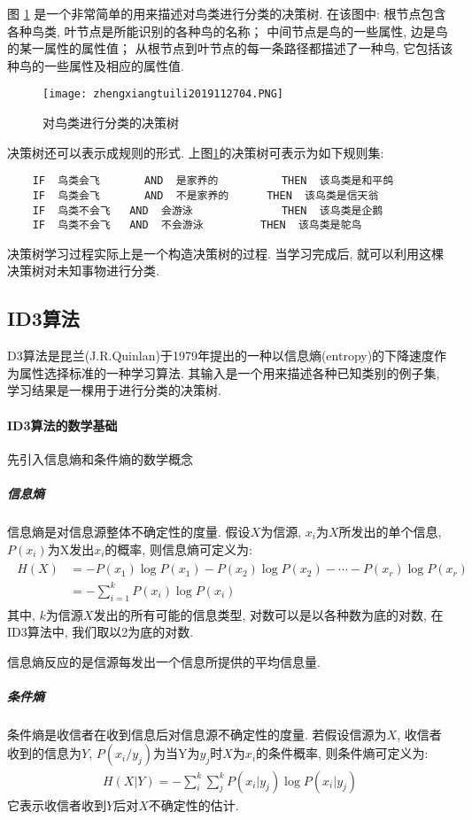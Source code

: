 图 \ref{AI32fig2704} 是一个非常简单的用来描述对鸟类进行分类的决策树.
在该图中: 根节点包含各种鸟类, 叶节点是所能识别的各种鸟的名称； 中间节点是鸟的一些属性, 边是鸟的某一属性的属性值； 从根节点到叶节点的每一条路径都描述了一种鸟, 它包括该种鸟的一些属性及相应的属性值.
\begin{figure}[H]
\centering
\texttt{[image: zhengxiangtuili2019112704.PNG]}
\caption{对鸟类进行分类的决策树}
\label{AI32fig2704}
\end{figure}
 决策树还可以表示成规则的形式. 上图\ref{AI32fig2704}的决策树可表示为如下规则集:
\begin{Verbatim}
    IF  鸟类会飞       AND  是家养的          THEN  该鸟类是和平鸽
    IF  鸟类会飞       AND  不是家养的      THEN  该鸟类是信天翁
    IF  鸟类不会飞   AND  会游泳              THEN  该鸟类是企鹅
    IF  鸟类不会飞   AND  不会游泳         THEN  该鸟类是鸵鸟
\end{Verbatim}

决策树学习过程实际上是一个构造决策树的过程. 当学习完成后, 就可以利用这棵决策树对未知事物进行分类.
\subsection{ID3算法}
D3算法是昆兰(J.R.Quinlan)于1979年提出的一种以信息熵(entropy)的下降速度作为属性选择标准的一种学习算法. 其输入是一个用来描述各种已知类别的例子集, 学习结果是一棵用于进行分类的决策树.

\paragraph{ID3算法的数学基础}
先引入信息熵和条件熵的数学概念
\subparagraph{信息熵}
信息熵是对信息源整体不确定性的度量. 假设$X$为信源, $x_i$为$X$所发出的单个信息, $P(x_i)$为X发出$x_i$的概率, 则信息熵可定义为:
\begin{align}
  \begin{aligned}
  H(X) &=-P\left(x_{1}\right) \log P\left(x_{1}\right)-P\left(x_{2}\right) \log P\left(x_{2}\right)-\cdots-P\left(x_{r}\right) \log P\left(x_{r}\right) \\
                       &=-\sum_{i=1}^{k} P\left(x_{i}\right) \log P\left(x_{i}\right)
  \end{aligned}
\end{align}
其中, $k$为信源$X$发出的所有可能的信息类型, 对数可以是以各种数为底的对数, 在ID3算法中, 我们取以2为底的对数.
\begin{remark}
 信息熵反应的是信源每发出一个信息所提供的平均信息量.
\end{remark}
\subparagraph{条件熵}
条件熵是收信者在收到信息后对信息源不确定性的度量. 若假设信源为$X$, 收信者收到的信息为$Y$,  $P(x_i/y_j)$为当Y为$y_j$时$X$为$x_i$的条件概率, 则条件熵可定义为:
\begin{align}
  H(X | Y)=-\sum_{i}^{k} \sum_{j}^{k} P\left(x_{i} | y_{j}\right) \log P\left(x_{i} | y_{j}\right)
\end{align}
它表示收信者收到$Y$后对$X$不确定性的估计.

